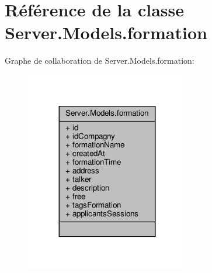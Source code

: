 \hypertarget{class_server_1_1_models_1_1formation}{}\section{Référence de la classe Server.\+Models.\+formation}
\label{class_server_1_1_models_1_1formation}


Graphe de collaboration de Server.\+Models.\+formation\+:
\nopagebreak
\begin{figure}[H]
\begin{center}
\leavevmode
\includegraphics[width=203pt]{class_server_1_1_models_1_1formation__coll__graph}
\end{center}
\end{figure}
